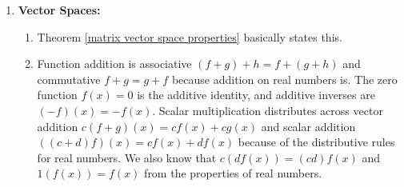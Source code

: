 {\begin{multicols}{2}
\begin{enumerate}
\begin{enumerate}
	\item 
	(1) Infinitely many solutions, 
	(2) not unique solutions, 
	(3) rref is not $I$,
	(4) column 2 is not a pivot,
	(5) columns are dependent,
	(6) rank is 1 (less than 2),
	(7) rows are dependent,
	(8) 
	$
	\begin{bmatrix}[cc|cc] 2&1&1&0\\4&2&0&1\end{bmatrix}
	\xrightarrow{\rref}
	\begin{bmatrix}[cc|cc] 1&1/2&0&1/4 \\0&0&1&-1/2\end{bmatrix}
	$ so $(1,0)$ is not in column space,
	(9) $A\inv$ does not exist,
	(10) $|A|=0 $,
	(11) $\lambda = 4, 0$ (zero is an eigenvalue).

	\item The only solution to the homogeneous system is zero, which means all 11 items are true. In particular, $A\inv=\begin{bmatrix}  
	\frac{2}{3} & -\frac{1}{3} & -\frac{2}{9} \\
 -\frac{1}{3} & \frac{2}{3} & -\frac{5}{9} \\
 0 & 0 & \frac{1}{3}
 \end{bmatrix}$, 
	$|A| = 9$, $\lambda = 3,3,1$.
	
	\item There is more than one solution to the homogeneous system. So all 11 items are false.  $|A|=0$.  The eigenvalues are $\frac12(-1 -\sqrt{21}), \frac12 (-1 + \sqrt{21}), 0$ (zero is an eigenvalue).
	
\end{enumerate}






\item \textbf{Vector Spaces:}  

\begin{enumerate}
	\item Theorem \ref{matrix vector space properties} basically states this. 
	\item Function addition is associative $(f+g)+h=f+(g+h)$ and commutative $f+g=g+f$ because addition on real numbers is.  The zero function $f(x)=0$ is the additive identity, and additive inverses are $(-f)(x) = -f(x)$. Scalar multiplication distributes across vector addition $c(f+g)(x) = cf(x)+cg(x)$ and scalar addition $((c+d)f)(x) = cf(x)+df(x)$ because of the distributive rules for real numbers. We also know that $c(df(x)) = (cd)f(x)$ and $1(f(x))=f(x)$ from the properties of real numbers.
	

\end{enumerate}
\end{enumerate}
\end{multicols}}
